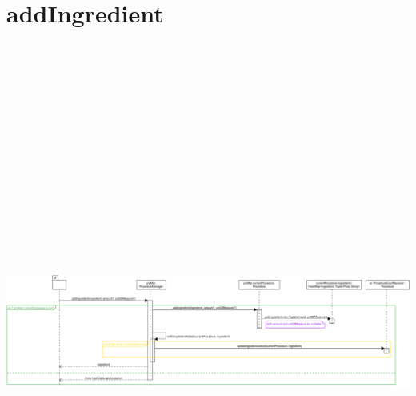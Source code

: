 \section{addIngredient}
\includegraphics[max width=\textwidth, max height=190mm]{../resources/img/GRP/DSD/op3.png}
\endgroup

\begingroup\centering
\renewcommand{\thesection}{5}
